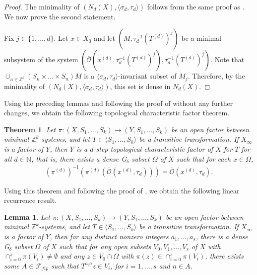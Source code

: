 \documentclass[11pt,reqno]{amsart}
\newcommand{\Z}{\mathbb{Z}}
\newcommand{\N}{\mathbb{N}}
\newcommand{\cF}{{\mathcal F}}
\newcommand{\cO}{{\mathcal O}}
\newtheorem{theorem}{Theorem}[section]
\newtheorem{lemma}[lemma]{Lemma}
\theoremstyle{definition}
\theoremstyle{remark}
\begin{document}
\begin{proof}
    The minimality of $(N_d(X),\langle \sigma_d,\tau_d\rangle)$ follows from the same proof as {\cite[Proposition 1.55]{Glasner_ergodic_theory_joinings:2003}}. We now prove the second statement.

    Fix $j\in \{1,\dots,d\}$. Let $x\in X_0$ and let $(M,\tau_{d}^{-1}(T^{(d)})^{j})$ be a minimal subsystem of the system $(\overline{\cO}(x^{(d)},\tau_{d}^{-1}(T^{(d)})^{j}),\tau_{d}^{-1}(T^{(d)})^{j})$. Note that $\cup_{n\in \Z^k}(S_n\times \dots \times S_n) M$ is a $\langle \sigma_{d},\tau_{d}\rangle$-invariant subset of $M_j$. Therefore, by the minimality of $(N_d(X),\langle \sigma_d,\tau_d\rangle)$, this set is dense in $N_d(X)$.
\end{proof}


Using the preceding lemmas and following the proof of {\cite[Theorem 4.2]{Glasner_Huang_Shao_Weiss_Ye_Topological_characteristic_factors:2020}} without any further changes, we obtain the following topological characteristic factor theorem.

\begin{theorem}
    Let $\pi\colon (X,S_1,\dots,S_k) \to (Y,S_1,\dots,S_k)$ be an open factor between minimal $\Z^k$-systems, and let $T\in \langle S_{1},\dots,S_{k}\rangle$ be a transitive transformation. If $X_\infty$ is a factor of $Y$, then $Y$ is a \emph{$d$-step topological characteristic factor} of $X$ for $T$ for all $d\in \N$, that is, there exists a dense G$_\delta$ subset $\Omega$ of $X$ such that for each $x\in \Omega$,\begin{align*}
       (\pi^{(d)})^{-1}(\pi^{(d)}( \overline{\cO}(x^{(d)},\tau_d)))= \overline{\cO}(x^{(d)},\tau_d).
    \end{align*}
\end{theorem}

Using this theorem and following the proof of {\cite[Lemma 2.19]{Qiu_poly_orbits_tot_minimal:2023}}, we obtain the following linear recurrence result.

\begin{lemma}
    Let $\pi\colon (X,S_1,\dots,S_k) \to (Y,S_1,\dots,S_k)$ be an open factor between minimal $\Z^k$-systems, and let $T\in \langle S_{1},\dots,S_{k}\rangle$ be a transitive transformation. If $X_\infty$ is a factor of $Y$, then for any distinct nonzero integers $a_1,\dots,a_s$, there is a dense G$_\delta$ subset $\Omega$ of $X$ such that for any open subsets $V_0,V_1,\dots,V_s$ of $X$ with $\cap_{i=0}^{s}\pi(V_i)\neq \emptyset$ and any $z\in V_0\cap \Omega$ with $\pi(z)\in\cap_{i=0}^{s}\pi(V_i)$, there exists some $A\in \cF_{fip}$ such that $T^{a_i n}z\in V_i$, for $i=1,\dots,s$ and $n\in A$.
\end{lemma}
\end{document}
